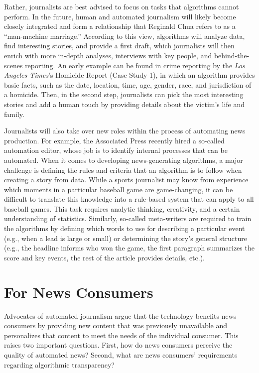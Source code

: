 \documentclass[notoc, symmetric, nobib, nols]{towcenter-guideto-book}
\begin{document}
Rather, journalists are best advised to focus on tasks that algorithms cannot perform. In the future, human and automated journalism will likely become closely integrated and form a relationship that Reginald Chua refers to as a ``man-machine marriage.'' According to this view, algorithms will analyze data, find interesting stories, and provide a first draft, which journalists will then enrich with more in-depth analyses, interviews with key people, and behind-the-scenes reporting. An early example can be found in crime reporting by the \textit{Los Angeles Times}'s Homicide Report (Case Study 1), in which an algorithm provides basic facts, such as the date, location, time, age, gender, race, and jurisdiction of a homicide. Then, in the second step, journalists can pick the most interesting stories and add a human touch by providing details about the victim's life and family.\autocite{young15} 

Journalists will also take over new roles within the process of automating news production. For example, the Associated Press recently hired a so-called automation editor, whose job is to identify internal processes that can be automated. When it comes to developing news-generating algorithms, a major challenge is defining the rules and criteria that an algorithm is to follow when creating a story from data. While a sports journalist may know from experience which moments in a particular baseball game are game-changing, it can be difficult to translate this knowledge into a rule-based system that can apply to all baseball games. This task requires analytic thinking, creativity, and a certain understanding of statistics. Similarly, so-called meta-writers are required to train the algorithms by defining which words to use for describing a particular event (e.g., when a lead is large or small) or determining the story's general structure (e.g., the headline informs who won the game, the first paragraph summarizes the score and key events, the rest of the article provides details, etc.).

\section{For News Consumers}

Advocates of automated journalism argue that the technology benefits news consumers by providing new content that was previously unavailable and personalizes that content to meet the needs of the individual consumer. This raises two important questions. First, how do news consumers perceive the quality of automated news? Second, what are news consumers' requirements regarding algorithmic transparency?
 
\end{document}
